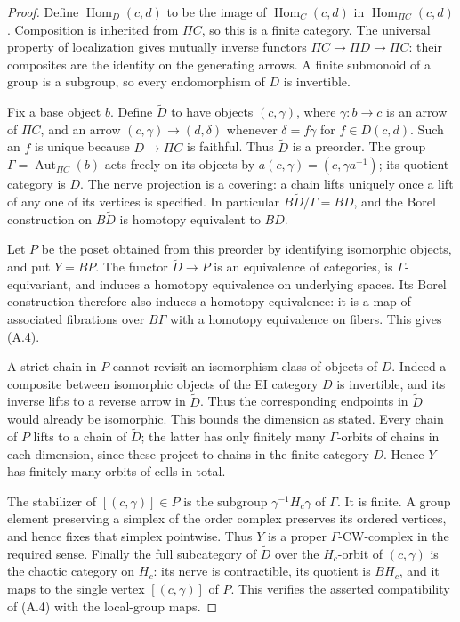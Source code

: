 \begin{proof}
Define $\operatorname{Hom}_D(c,d)$ to be the image of
$\operatorname{Hom}_C(c,d)$ in $\operatorname{Hom}_{\Pi C}(c,d)$.
Composition is inherited from $\Pi C$, so this is a finite category.
The universal property of localization gives mutually inverse functors
$\Pi C\to\Pi D\to\Pi C$: their composites are the identity on the
generating arrows. A finite submonoid of a group is a subgroup, so every
endomorphism of $D$ is invertible.

Fix a base object $b$. Define $\widetilde D$ to have objects $(c,\gamma)$,
where $\gamma:b\to c$ is an arrow of $\Pi C$, and an arrow
$(c,\gamma)\to(d,\delta)$ whenever $\delta=f\gamma$ for $f\in D(c,d)$.
Such an $f$ is unique because $D\to\Pi C$ is faithful. Thus
$\widetilde D$ is a preorder. The group
$\Gamma=\operatorname{Aut}_{\Pi C}(b)$ acts freely on its objects by
$a(c,\gamma)=(c,\gamma a^{-1})$; its quotient category is $D$.
The nerve projection is a covering: a chain lifts uniquely once a lift
of any one of its vertices is specified. In particular
$B\widetilde D/\Gamma=BD$, and the Borel construction on
$B\widetilde D$ is homotopy equivalent to $BD$.

Let $P$ be the poset obtained from this preorder by identifying isomorphic
objects, and put $Y=BP$. The functor $\widetilde D\to P$ is an
equivalence of categories, is $\Gamma$-equivariant, and induces a homotopy
equivalence on underlying spaces. Its Borel construction therefore also
induces a homotopy equivalence: it is a map of associated fibrations over
$B\Gamma$ with a homotopy equivalence on fibers. This gives (A.4).

A strict chain in $P$ cannot revisit an isomorphism class of objects of
$D$. Indeed a composite between isomorphic objects of the EI category $D$
is invertible, and its inverse lifts to a reverse arrow in $\widetilde D$. Thus
the corresponding endpoints in $\widetilde D$ would already be
isomorphic. This bounds the dimension as stated. Every chain of $P$
lifts to a chain of $\widetilde D$; the latter has only finitely many
$\Gamma$-orbits of chains in each dimension, since these project to
chains in the finite category $D$. Hence $Y$ has finitely many orbits of
cells in total.

The stabilizer of $[(c,\gamma)]\in P$ is the subgroup
$\gamma^{-1}H_c\gamma$ of $\Gamma$. It is finite. A group element
preserving a simplex of the order complex preserves its ordered vertices,
and hence fixes that simplex pointwise. Thus $Y$ is a proper
$\Gamma$-CW-complex in the required sense. Finally the full subcategory
of $\widetilde D$ over the $H_c$-orbit of $(c,\gamma)$ is the chaotic
category on $H_c$: its nerve is contractible, its quotient is $BH_c$,
and it maps to the single vertex $[(c,\gamma)]$ of $P$. This verifies
the asserted compatibility of (A.4) with the local-group maps.
\end{proof}

